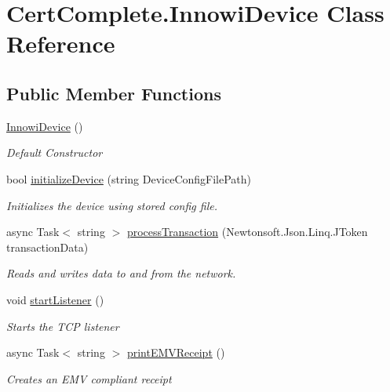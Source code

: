 \hypertarget{class_cert_complete_1_1_innowi_device}{}\section{Cert\+Complete.\+Innowi\+Device Class Reference}
\label{class_cert_complete_1_1_innowi_device}
\subsection*{Public Member Functions}
\begin{DoxyCompactItemize}
\item 
\mbox{\hyperlink{class_cert_complete_1_1_innowi_device_ad5c2b124be7515bd8973c53400629367}{Innowi\+Device}} ()
\begin{DoxyCompactList}\small\item\em Default Constructor \end{DoxyCompactList}\item 
bool \mbox{\hyperlink{class_cert_complete_1_1_innowi_device_adf36712e4b4f7090c69a4f5b55ff1de9}{initialize\+Device}} (string Device\+Config\+File\+Path)
\begin{DoxyCompactList}\small\item\em Initializes the device using stored config file. \end{DoxyCompactList}\item 
async Task$<$ string $>$ \mbox{\hyperlink{class_cert_complete_1_1_innowi_device_aa50e6a501d5d70ce75a6cbe66d8f5afe}{process\+Transaction}} (Newtonsoft.\+Json.\+Linq.\+J\+Token transaction\+Data)
\begin{DoxyCompactList}\small\item\em Reads and writes data to and from the network. \end{DoxyCompactList}\item 
void \mbox{\hyperlink{class_cert_complete_1_1_innowi_device_a1473af2c3c1eed973e430b84bebfd625}{start\+Listener}} ()
\begin{DoxyCompactList}\small\item\em Starts the T\+CP listener \end{DoxyCompactList}\item 
async Task$<$ string $>$ \mbox{\hyperlink{class_cert_complete_1_1_innowi_device_ab165bb74d2194d055a09b0ea09cdbad0}{print\+E\+M\+V\+Receipt}} ()
\begin{DoxyCompactList}\small\item\em Creates an E\+MV compliant receipt \end{DoxyCompactList}\item 

\end{DoxyCompactItemize}
